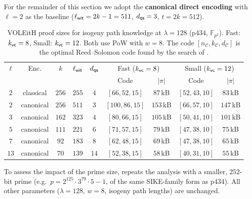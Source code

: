 \documentclass[11pt,a4paper]{article}
\theoremstyle{definition}
\theoremstyle{remark}
\newcommand{\F}{\mathbb{F}}
\newcommand{\calC}{\mathcal{C}}
\begin{document}
For the remainder of this section we adopt the \textbf{canonical direct encoding}
with $\ell = 2$ as the baseline ($\ell_{\sf wit} = 2k-1 = 511$,
$d_{\sf qs} = 3$, $t = 2k = 512$).

\begin{table}[H]
	\centering
	\caption{VOLEitH proof sizes for isogeny path knowledge at $\lambda = 128$
		(p434, $\F_{p^2}$). Fast: $k_{\sf vc}=8$, Small: $k_{\sf vc}=12$.
		Both use PoW with $w = 8$. The code $[n_{\calC}, k_{\calC}, d_{\calC}]$
		is the optimal Reed--Solomon code found by the search of
		.}
	\label{tab:voleith-proof-sizes}
	\begin{tabular}{c c c c c c c c c}
		\toprule
		$\ell$ & Enc. & $k$ & $\ell_{\sf wit}$ & $d_{\sf qs}$ &
		\multicolumn{2}{c}{Fast ($k_{\sf vc}=8$)} &
		\multicolumn{2}{c}{Small ($k_{\sf vc}=12$)} \\
		& & & & & Code & $|\pi|$ & Code & $|\pi|$ \\
		\midrule
		$2$ & classical & $256$ & $255$ & $4$ & $[66,52,15]$ & $87$\,kB & $[52,43,10]$ & $83$\,kB \\
		$2$ & canonical & $256$ & $511$ & $3$ & $[100,86,15]$ & $153$\,kB & $[66,57,10]$ & $147$\,kB \\
		$3$ & canonical & $162$ & $323$ & $4$ & $[80,66,15]$ & $105$\,kB & $[50,41,10]$ & $101$\,kB \\
		$5$ & canonical & $111$ & $221$ & $6$ & $[71,57,15]$ & $79$\,kB & $[47,38,10]$ & $75$\,kB \\
		$7$ & canonical & $92$ & $183$ & $8$ & $[62,48,15]$ & $69$\,kB & $[47,38,10]$ & $65$\,kB \\
		$13$ & canonical & $70$ & $139$ & $14$ & $[52,38,15]$ & $58$\,kB & $[40,31,10]$ & $55$\,kB \\
		\bottomrule
	\end{tabular}
\end{table}

To assess the impact of the prime size, 
repeats the analysis with a smaller, $252$-bit prime (e.g.\
$p = 2^{125} \cdot 3^{79} \cdot 5 - 1$, of the same SIKE-family form as p434).
All other parameters ($\lambda = 128$, $w = 8$, isogeny path lengths) are unchanged.
\end{document}
